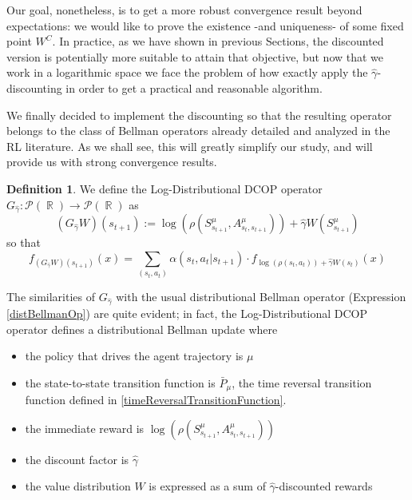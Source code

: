 \documentclass[12pt,a4paper,openright,twoside]{article}
\DeclareMathOperator*{\R}{\mathbb{R}}
\numberwithin{equation}{section}
\theoremstyle{definition}
\newtheorem{definition}{Definition}
\theoremstyle{remark}
\theoremstyle{plain}
\begin{document}
Our goal, nonetheless, is to get a more robust convergence result beyond expectations: we would like to prove the existence -and uniqueness- of some fixed point $W^C$. In practice, as we have shown in previous Sections, the discounted version is potentially more suitable to attain that objective, but now that we work in a logarithmic space we face the problem of how exactly apply the $\hat{\gamma}$-discounting in order to get a practical and reasonable algorithm. 

We finally decided to implement the discounting so that the resulting operator belongs to the class of Bellman operators already detailed and analyzed in the RL literature. As we shall see, this will greatly simplify our study, and will provide us with strong convergence results.


\begin{definition} 
	We define the Log-Distributional DCOP operator $G_{\hat{\gamma}}: \mathscr{P}(\R) \rightarrow \mathscr{P}(\R)$ as
	\begin{equation} \label{LogDistDCOPoperator}
		(G_{\hat{\gamma}} W) (s_{t+1}) := \log \left( \rho(S^{\mu}_{s_{t+1}},A^{\mu}_{s_{t},s_{t+1}}) \right) + \hat{\gamma} W(S^{\mu}_{s_{t+1}})
	\end{equation}
	so that
	\begin{equation*}
		f_{(G_{\hat{\gamma}}W)(s_{t+1})} (x) = \sum_{(s_{t},a_{t})} \alpha(s_{t},a_{t}|s_{t+1}) \cdot f_{\log\left( \rho(s_{t},a_{t})\right) + \hat{\gamma}W(s_t)}(x)
	\end{equation*}
\end{definition}

The similarities of $G_{\hat{\gamma}}$ with the usual distributional Bellman operator (Expression \ref{distBellmanOp}) are quite evident; in fact, the Log-Distributional DCOP operator defines a distributional Bellman update where
\begin{itemize}
	\item the policy that drives the agent trajectory is $\mu$
	\item the state-to-state transition function is $\bar{P}_{\mu}$, the time reversal transition function defined in \ref{timeReversalTransitionFunction}.
	\item the immediate reward is $\log \left( \rho(S^{\mu}_{s_{t+1}},A^{\mu}_{s_{t},s_{t+1}}) \right)$
	\item the discount factor is $\hat{\gamma}$
	\item the value distribution $W$ is expressed as a sum of $\hat{\gamma}$-discounted rewards
\end{itemize}
\end{document}
